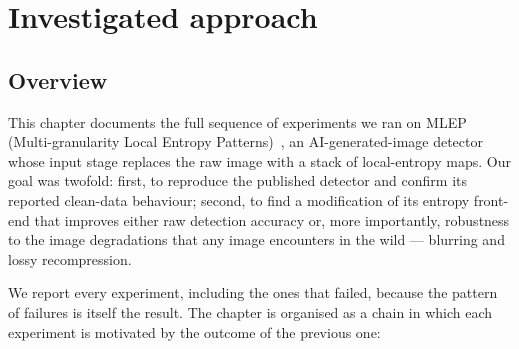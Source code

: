 %
%
\chapter{Investigated approach}
\label{chapter:proposedApproach}

\section{Overview}
\label{sec:overview}

This chapter documents the full sequence of experiments we ran on MLEP
(Multi-granularity Local Entropy Patterns)~\cite{yuan2025mlep}, an
AI-generated-image detector whose input stage replaces the raw image with a
stack of local-entropy maps. Our goal was twofold: first, to reproduce the
published detector and confirm its reported clean-data behaviour; second, to
find a modification of its entropy front-end that improves either raw detection
accuracy or, more importantly, robustness to the image degradations that any
image encounters in the wild --- blurring and lossy recompression.

We report every experiment, including the ones that failed, because the pattern
of failures is itself the result. The chapter is organised as a chain in which
each experiment is motivated by the outcome of the previous one:

